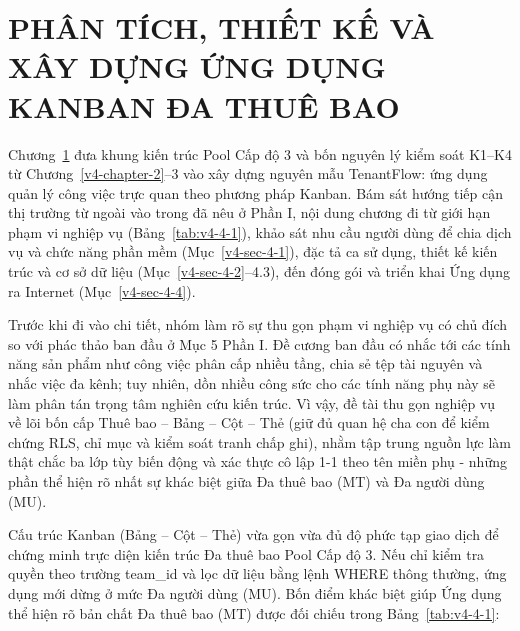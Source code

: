 \chapter{PHÂN TÍCH, THIẾT KẾ VÀ XÂY DỰNG ỨNG DỤNG KANBAN ĐA THUÊ BAO}\label{v4-chapter-4}

Chương~\ref{v4-chapter-4} đưa khung kiến trúc Pool Cấp độ 3 và bốn nguyên lý kiểm soát K1--K4 từ Chương~\ref{v4-chapter-2}--3 vào xây dựng nguyên mẫu TenantFlow: ứng dụng quản lý công việc trực quan theo phương pháp Kanban. Bám sát hướng tiếp cận thị trường từ ngoài vào trong đã nêu ở Phần I, nội dung chương đi từ giới hạn phạm vi nghiệp vụ (Bảng~\ref{tab:v4-4-1}), khảo sát nhu cầu người dùng để chia dịch vụ và chức năng phần mềm (Mục~\ref{v4-sec-4-1}), đặc tả ca sử dụng, thiết kế kiến trúc và cơ sở dữ liệu (Mục~\ref{v4-sec-4-2}--4.3), đến đóng gói và triển khai Ứng dụng ra Internet (Mục~\ref{v4-sec-4-4}).

Trước khi đi vào chi tiết, nhóm làm rõ sự thu gọn phạm vi nghiệp vụ có chủ đích so với phác thảo ban đầu ở Mục 5 Phần I. Đề cương ban đầu có nhắc tới các tính năng sản phẩm như công việc phân cấp nhiều tầng, chia sẻ tệp tài nguyên và nhắc việc đa kênh; tuy nhiên, dồn nhiều công sức cho các tính năng phụ này sẽ làm phân tán trọng tâm nghiên cứu kiến trúc. Vì vậy, đề tài thu gọn nghiệp vụ về lõi bốn cấp Thuê bao -- Bảng -- Cột -- Thẻ (giữ đủ quan hệ cha con để kiểm chứng RLS, chỉ mục và kiểm soát tranh chấp ghi), nhằm tập trung nguồn lực làm thật chắc ba lớp tùy biến động và xác thực cô lập 1-1 theo tên miền phụ - những phần thể hiện rõ nhất sự khác biệt giữa Đa thuê bao (MT) và Đa người dùng (MU).

Cấu trúc Kanban (Bảng -- Cột -- Thẻ) vừa gọn vừa đủ độ phức tạp giao dịch để chứng minh trực diện kiến trúc Đa thuê bao Pool Cấp độ 3. Nếu chỉ kiểm tra quyền theo trường team\_\allowbreak{}id và lọc dữ liệu bằng lệnh WHERE thông thường, ứng dụng mới dừng ở mức Đa người dùng (MU). Bốn điểm khác biệt giúp Ứng dụng thể hiện rõ bản chất Đa thuê bao (MT) được đối chiếu trong Bảng~\ref{tab:v4-4-1}:

